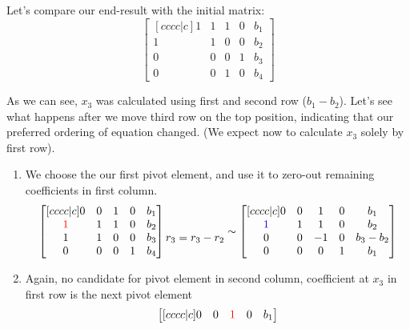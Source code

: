 Let's compare our end-result with the initial matrix:
\begin{equation}
\begin{bmatrix}[cccc|c]
    1 & 1 & 1 & 0 & b_1 \\ 
    1 & 1 & 0 & 0 & b_2 \\ 
    0 & 0 & 0 & 1 & b_3 \\ 
    0 & 0 & 1 & 0 & b_4
\end{bmatrix}
\end{equation}

As we can see, $x_3$ was calculated using first and second row ($b_1 - b_2$).
Let's see what happens after we move third row on the top position, indicating that our preferred ordering of equation changed. (We expect now to calculate $x_3$ solely by first row).

\begin{enumerate}
\item We choose the our first pivot element, and use it to zero-out remaining coefficients in first column.
\begin{equation}
\begin{bmatrix}[cccc|c]
    0 & 0 & 1 & 0 & b_1 \\
    \textcolor{red}{1} & 1 & 1 & 0 & b_2 \\ 
    1 & 1 & 0 & 0 & b_3 \\ 
    0 & 0 & 0 & 1 & b_4 \\ 
\end{bmatrix}
\begin{matrix} \\ \\ r_3 = r_3 - r_2 \\ \\ \end{matrix} \sim
\begin{bmatrix}[cccc|c]
    0 & 0 & 1 & 0 & b_1 \\
    \textcolor{blue}{1} & 1 & 1 & 0 & b_2 \\ 
    0 & 0 & -1 & 0 & b_3 - b_2 \\ 
    0 & 0 & 0 & 1 & b_1 \\ 
\end{bmatrix}
\end{equation}
\item
Again, no candidate for pivot element in second column, coefficient at $x_3$ in first row is the next pivot element
\begin{equation}
\begin{bmatrix}[cccc|c]
    0 & 0 & \textcolor{red}{1} & 0 & b_1 \\

\end{bmatrix}
\end{equation}
\end{enumerate}
